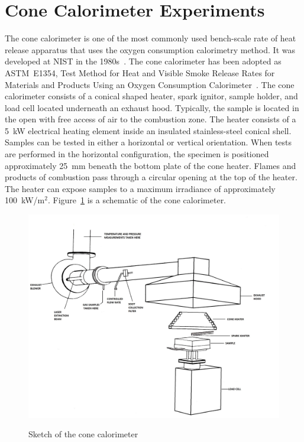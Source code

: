 \documentclass[twoside]{uocthesis}
\begin{document}
\section{Cone Calorimeter Experiments}

The cone calorimeter is one of the most commonly used bench-scale rate of heat release apparatus that uses the oxygen consumption calorimetry method. It was developed at NIST in the 1980s~\cite{babrauskas:1984}. The cone calorimeter has been adopted as ASTM~E1354, Test Method for Heat and Visible Smoke Release Rates for Materials and Products Using an Oxygen Consumption Calorimeter~\cite{ASTM_E1354}. The cone calorimeter consists of a conical shaped heater, spark ignitor, sample holder, and load cell located underneath an exhaust hood. Typically, the sample is located in the open with free access of air to the combustion zone. The heater consists of a 5~kW electrical heating element inside an insulated stainless-steel conical shell. Samples can be tested in either a horizontal or vertical orientation. When tests are performed in the horizontal configuration, the specimen is positioned approximately 25~mm beneath the bottom plate of the cone heater. Flames and products of combustion pass through a circular opening at the top of the heater. The heater can expose samples to a maximum irradiance of approximately 100~kW/m$^2$. Figure~\ref{Cone_Cal} is a schematic of the cone calorimeter.

\begin{figure}
	\centering
	\includegraphics[width=\textwidth]{../Figures/Cone_Cal} \\
	\caption[Sketch of the cone calorimeter]{Sketch of the cone calorimeter}
	\label{Cone_Cal}
\end{figure}
\end{document}
